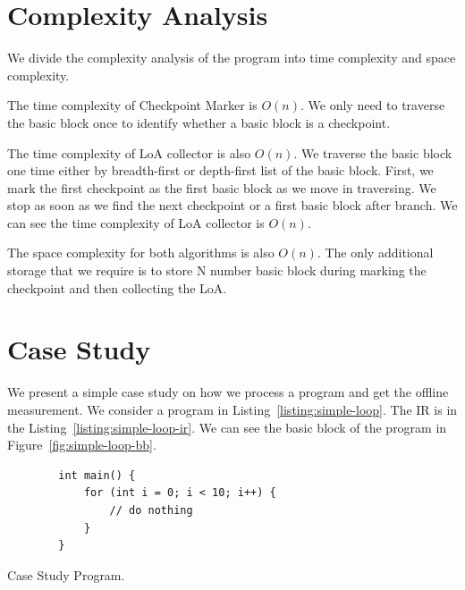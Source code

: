 \section{Complexity Analysis}

We divide the complexity analysis of the program into time complexity and space
complexity. 

The time complexity of Checkpoint Marker is $O(n)$. We only need to traverse the
basic block once to identify whether a basic block is a checkpoint.

The time complexity of LoA collector is also $O(n)$. We traverse the basic block
one time either by breadth-first or depth-first list of the basic block. First,
we mark the first checkpoint as the first basic block as we move in traversing.
We stop as soon as we find the next checkpoint or a first basic block after
branch. We can see the time complexity of LoA collector is $O(n)$.

The space complexity for both algorithms is also $O(n)$. The only additional
storage that we require is to store N number basic block during marking the
checkpoint and then collecting the LoA.

\section{Case Study}

We present a simple case study on how we process a program and
get the offline measurement. We consider a program in
Listing~\ref{listing:simple-loop}. The IR is in the
Listing~\ref{listing:simple-loop-ir}. We can see the basic block of the program
in Figure~\ref{fig:simple-loop-bb}. 


\begin{listing}[htbp]
    \begin{verbatim}
        int main() {
            for (int i = 0; i < 10; i++) {
                // do nothing
            }
        }
    \end{verbatim}
    \caption{Case Study Program.}    
    \label{listing:simple-loop}
\end{listing}


